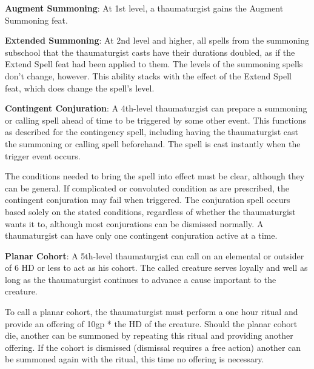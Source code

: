 \textbf{Augment Summoning}: At 1st level, a thaumaturgist gains the Augment Summoning feat.

\textbf{Extended Summoning}: At 2nd level and higher, all spells from the summoning subschool that the thaumaturgist casts have their durations doubled, as if the Extend Spell feat had been applied to them. The levels of the summoning spells don’t change, however. This ability stacks with the effect of the Extend Spell feat, which does change the spell’s level.

\textbf{Contingent Conjuration}: A 4th-level thaumaturgist can prepare a summoning or calling spell ahead of time to be triggered by some other event. This functions as described for the contingency spell, including having the thaumaturgist cast the summoning or calling spell beforehand. The spell is cast instantly when the trigger event occurs.

The conditions needed to bring the spell into effect must be clear, although they can be general. If complicated or convoluted condition as are prescribed, the contingent conjuration may fail when triggered. The conjuration spell occurs based solely on the stated conditions, regardless of whether the thaumaturgist wants it to, although most conjurations can be dismissed normally. A thaumaturgist can have only one contingent conjuration active at a time.

\textbf{Planar Cohort}: A 5th-level thaumaturgist can call on an elemental or outsider of 6 HD or less to act as his cohort. The called creature serves loyally and well as long as the thaumaturgist continues to advance a cause important to the creature.

To call a planar cohort, the thaumaturgist must perform a one hour ritual and provide an offering of 10gp * the HD of the creature. Should the planar cohort die, another can be summoned by repeating this ritual and providing another offering. If the cohort is dismissed (dismissal requires a free action) another can be summoned again with the ritual, this time no offering is necessary.